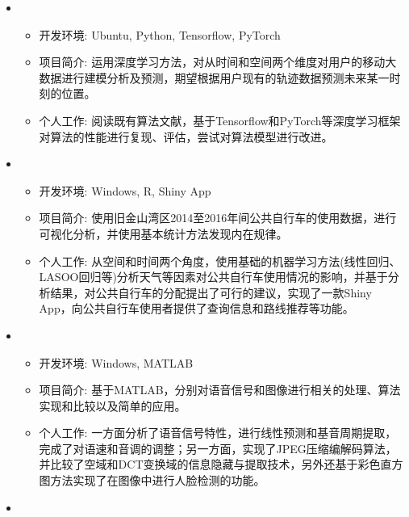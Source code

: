   \begin{itemize}[leftmargin=*]
    \item
      {\small
      \begin{itemize}
        \item 开发环境: Ubuntu, Python, Tensorflow, PyTorch
        \item 项目简介: 运用深度学习方法，对从时间和空间两个维度对用户的移动大数据进行建模分析及预测，期望根据用户现有的轨迹数据预测未来某一时刻的位置。
        \item 个人工作: 阅读既有算法文献，基于Tensorflow和PyTorch等深度学习框架对算法的性能进行复现、评估，尝试对算法模型进行改进。 
      \end{itemize}
      }
    \item
      {\small
      \begin{itemize}
        \item 开发环境: Windows, R, Shiny App
        \item 项目简介: 使用旧金山湾区2014至2016年间公共自行车的使用数据，进行可视化分析，并使用基本统计方法发现内在规律。
        \item 个人工作: 从空间和时间两个角度，使用基础的机器学习方法(线性回归、LASOO回归等)分析天气等因素对公共自行车使用情况的影响，并基于分析结果，对公共自行车的分配提出了可行的建议，实现了一款Shiny App，向公共自行车使用者提供了查询信息和路线推荐等功能。
      \end{itemize}
      }
    \item
    {\small
    \begin{itemize}
      \item 开发环境: Windows, MATLAB
      \item 项目简介: 基于MATLAB，分别对语音信号和图像进行相关的处理、算法实现和比较以及简单的应用。
      \item 个人工作: 一方面分析了语音信号特性，进行线性预测和基音周期提取，完成了对语速和音调的调整；另一方面，实现了JPEG压缩编解码算法，并比较了空域和DCT变换域的信息隐藏与提取技术，另外还基于彩色直方图方法实现了在图像中进行人脸检测的功能。
    \end{itemize}
    }
    \item {}
    {\small
    \begin{itemize}

\end{itemize}}
\end{itemize}
